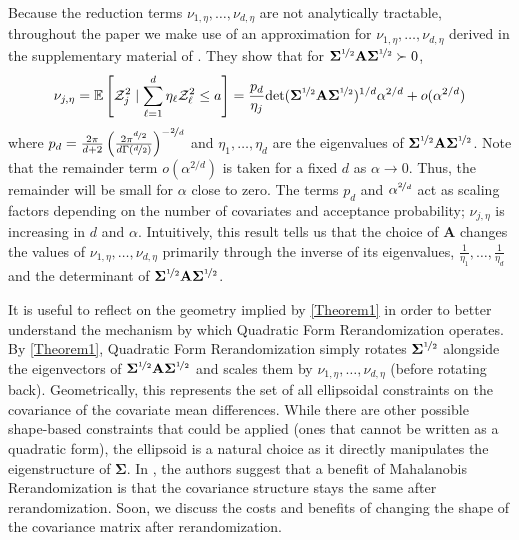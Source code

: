 \documentclass[11pt,twoside]{article}
\theoremstyle{definition}
\theoremstyle{remark}
\begin{document}
Because the reduction terms $\nu_{1,\eta}, \dots, \nu_{d, \eta}$ are not analytically tractable, throughout the paper we make use of an approximation for $\nu_{1, \eta}, \ldots, \nu_{d, \eta}$ derived in the supplementary material of \cite{lu2023design}. They show that for $\mathbf{\Sigma}^{\nicefrac{1}{2}} \mathbf{A} \mathbf{\Sigma}^{\nicefrac{1}{2}} \succ 0$,
\begin{align} \label{q_definition_main_text}
    \nu_{j, \eta} = \mathbb{E}\left[ \mathcal{Z}^2_j \mid \sum^d_{\ell =1} \eta_\ell \mathcal{Z}^2_\ell \leq a \right] = \frac{p_d}{\eta_j} \text{det}(\mathbf{\Sigma}^{\nicefrac{1}{2}}\mathbf{A}\mathbf{\Sigma}^{\nicefrac{1}{2}})^{1/d} \alpha^{2/d} + o(\alpha^{2/d})
\end{align}
where $p_d = \frac{2\pi}{d+2}\left(\frac{2\pi^{\nicefrac{d}{2}}}{d \Gamma(\nicefrac{d}{2})} \right)^{-\nicefrac{2}{d}}$ and $\eta_1, \ldots, \eta_d$ are the eigenvalues of $\mathbf{\Sigma}^{\nicefrac{1}{2}} \mathbf{A} \mathbf{\Sigma}^{\nicefrac{1}{2}}$. Note that the remainder term $o(\alpha^{2/d})$ is taken for a fixed $d$ as $\alpha \to 0$. Thus, the remainder will be small for $\alpha$ close to zero. The terms $p_d$ and $\alpha^{\nicefrac{2}{d}}$ act as scaling factors depending on the number of covariates and acceptance probability; $\nu_{j, \eta}$ is increasing in $d$ and $\alpha$. Intuitively, this result tells us that the choice of $\mathbf{A}$ changes the values of $\nu_{1, \eta}, \ldots, \nu_{d, \eta}$ primarily through the inverse of its eigenvalues, $\frac{1}{\eta_1}, \ldots, \frac{1}{\eta_d}$ and the determinant of $\mathbf{\Sigma}^{\nicefrac{1}{2}}\mathbf{A}\mathbf{\Sigma}^{\nicefrac{1}{2}}$. 

It is useful to reflect on the geometry implied by \cref{Theorem1} in order to better understand the mechanism by which Quadratic Form Rerandomization operates. By \cref{Theorem1}, Quadratic Form Rerandomization simply rotates $\mathbf{\Sigma}^{\nicefrac{1}{2}}$ alongside the eigenvectors of $\mathbf{\Sigma}^{\nicefrac{1}{2}} \mathbf{A} \mathbf{\Sigma}^{\nicefrac{1}{2}}$ and scales them by $\nu_{1, \eta}, \ldots, \nu_{d, \eta}$ (before rotating back). Geometrically, this represents the set of all ellipsoidal constraints on the covariance of the covariate mean differences. While there are other possible shape-based constraints that could be applied (ones that cannot be written as a quadratic form), the ellipsoid is a natural choice as it directly manipulates the eigenstructure of $\mathbf{\Sigma}$. In \cite{morgan2012rerandomization}, the authors suggest that a benefit of Mahalanobis Rerandomization is that the covariance structure stays the same after rerandomization. Soon, we discuss the costs and benefits of changing the shape of the covariance matrix after rerandomization. 
\end{document}
